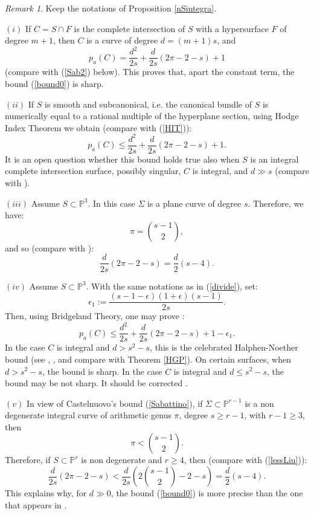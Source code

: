 \documentclass[9pt,a4paper]{amsart}
\theoremstyle{plain}
\theoremstyle{definition}
\theoremstyle{remark}
\newtheorem{remark}[theorem]{Remark}
\begin{document}
\begin{remark}\label{Halphen}
Keep the notations of Proposition \ref{nSintegra}.

\smallskip
$(i)$ If $C=S\cap F$ is the complete intersection of $S$ with a
hypersurface $F$ of degree $m+1$, then $C$ is a curve of degree
$d=(m+1)s$, and
$$
p_a(C)=\frac{d^2}{2s}+\frac{d}{2s}(2\pi-2-s)+1
$$
(compare with (\ref{Sab2}) below).
This proves that, apart the constant term, the bound (\ref{bound0})
is sharp.

\smallskip
$(ii)$ If $S$ is smooth and subcanonical, i.e. the canonical bundle
of $S$ is numerically equal to a rational multiple of the hyperplane
section, using Hodge Index Theorem we obtain  \cite[p. 196]{Harris1980}
(compare with (\ref{HIT})):
$$
p_a(C)\leq \frac{d^2}{2s}+\frac{d}{2s}(2\pi-2-s)+1.
$$
It is an open question whether this bound holds true also when $S$
is an integral complete intersection surface, possibly singular,  $C$ is integral, and $d\gg s$ (compare
with \cite{D3}).

\smallskip
$(iii)$ Assume $S\subset \mathbb P^3$. In this case $\Sigma$ is a
plane curve of degree $s$. Therefore, we have:
$$
\pi=\binom{s-1}{2},
$$
and so (compare with \cite[Corollary 4.15]{Liu}):
$$
\frac{d}{2s}(2\pi-2-s)=\frac{d}{2}(s-4).
$$

\smallskip
$(iv)$ Assume $S\subset \mathbb P^3$. With the same notations as in
(\ref{divide}), set:
$$
\epsilon_1:=\frac{(s-1-\epsilon)(1+\epsilon)(s-1)}{2s}.
$$
Then, using Bridgeland Theory, one may prove \cite[Lemma 4.1]{Liu}:
$$
p_a(C)\leq \frac{d^2}{2s}+\frac{d}{2s}(2\pi-2-s)+1-\epsilon_1.
$$
In the case $C$ is integral and $d>s^2-s$, this is the celebrated
Halphen-Noether bound (see \cite{Harris1980}, \cite{GP}, and compare with
Theorem \ref{HGP}). On certain
surfaces, when $d>s^2-s$, the bound is sharp. In the case $C$ is
integral and $d\leq s^2-s$, the bound may be not sharp. It should be
corrected \cite{Harris1980}.


\smallskip
$(v)$ In view of Castelnuovo's bound (\ref{Sabattino}), if $\Sigma\subset
\mathbb P^{r-1}$ is a non degenerate integral curve of arithmetic
genus $\pi$, degree $s\geq r-1$, with $r-1\geq 3$, then
$$
\pi<\binom{s-1}{2}.
$$
Therefore, if $S\subset \mathbb P^r$ is non degenerate and $r\geq
4$, then (compare with (\ref{lessLiu})):
$$
\frac{d}{2s}(2\pi-2-s)<\frac{d}{2s}\left(2\binom{s-1}{2}-2-s\right)=\frac{d}{2}(s-4).
$$
This explains why, for $d\gg 0$, the bound (\ref{bound0}) is more precise
than the one that appears in \cite[Corollary 4.4]{Liu}.
\end{remark}
\end{document}

